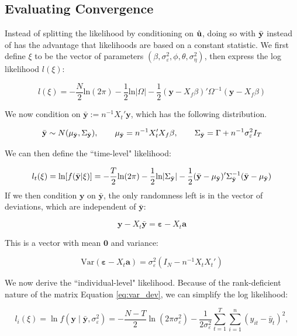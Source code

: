 \subsection{Evaluating Convergence}


Instead of splitting the likelihood by conditioning on $\hat{\mathbf{u}}$, doing so with $\bar{\mathbf{y}}$ instead of has the advantage that likelihoods are based on a constant statistic. We first define $\xi$ to be the vector
of parameters $({\beta}, {\sigma}_\varepsilon^2, {\phi}, {\theta}, {\sigma}_\eta^2)$, then express the log likelihood $l(\xi)$:

$$ l(\xi) = -\frac{N}{2}\text{ln}(2\pi) - \frac{1}{2}\text{ln}|\Omega| - \frac{1}{2}(\mathbf{y}-X_f\beta)'\Omega^{-1}(\mathbf{y} - X_f\beta) $$

We now condition on $\bar{\mathbf{y}} := n^{-1}X_t'\mathbf{y}$, which has the following distribution.

$$\bar{\mathbf{y}} \sim N(\mu_{\bar{\mathbf{y}}},\Sigma_{\bar{\mathbf{y}}}), \qquad \mu_{\bar{\mathbf{y}}} = n^{-1}X_t'X_f\beta, \qquad \Sigma_{\bar{\mathbf{y}}} =   \Gamma + n^{-1}\sigma_\varepsilon^2I_T $$

We can then define the ``time-level" likelihood:


$$ l_t(\xi) = \text{ln}[f(\bar{\mathbf{y}}|\xi)] = -\frac{T}{2}\text{ln}(2\pi) - \frac{1}{2}\text{ln}|\Sigma_{\bar{\mathbf{y}}}| - \frac{1}{2}(\bar{\mathbf{y}} - \mu_{\bar{\mathbf{y}}})'\Sigma_{\bar{\mathbf{y}}}^{-1}(\bar{\mathbf{y}} - \mu_{\bar{\mathbf{y}}}) $$
If we then condition $\mathbf{y}$ on $\bar{\mathbf{y}}$, the only randomness left is in the vector of deviations, which are independent of $\bar{\mathbf{y}}$:

$$ \mathbf{y} - X_t\bar{\mathbf{y}} = \bm{\varepsilon} - X_t\mathbf{a}   $$

This is a vector with mean $\mathbf{0}$ and variance:

\begin{equation}
    \text{Var}(\bm{\varepsilon} - X_t\mathbf{a}) = \sigma_\varepsilon^2(I_N  -  n^{-1}X_tX_t') 
    \label{eq:var_dev}
\end{equation}




We now derive the ``individual-level" likelihood. Because of the rank-deficient 
nature of the matrix Equation \ref{eq:var_dev}, we can simplify the log likelihood:


\begin{equation}
l_i(\xi) = \ln f(\mathbf{y} \mid \bar{\mathbf{y}}, \sigma_\varepsilon^2)
= -\frac{N-T}{2} \ln(2 \pi \sigma_\varepsilon^2)
- \frac{1}{2 \sigma_\varepsilon^2} \sum_{t=1}^{T} \sum_{i=1}^{n} 
\left( y_{it} - \bar{y}_t \right)^2,
\end{equation}


